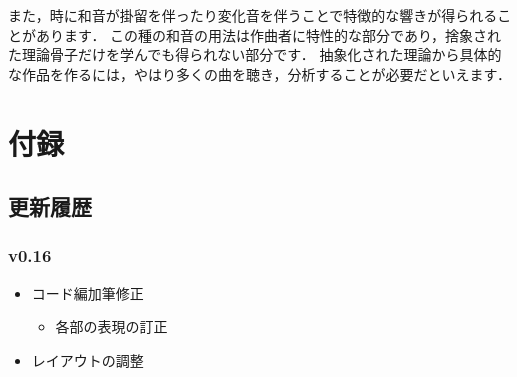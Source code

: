 \documentclass[dvipdfmx,uplatex,b5paper,openany,jbase=12Q,nomag*,textwidth-limit=44%
               ]{gachimuchi}[2020/05/05]
\begin{document}
また，時に和音が掛留を伴ったり変化音を伴うことで特徴的な響きが得られることがあります．
この種の和音の用法は作曲者に特性的な部分であり，捨象された理論骨子だけを学んでも得られない部分です．
抽象化された理論から具体的な作品を作るには，やはり多くの曲を聴き，分析することが必要だといえます．

\begin{comment}
\appendix
\chapter{コード進行について}
コード進行を作る場合には，おおよそ次の要素を考える必要があるでしょう．
\begin{itemize}
  \item メロディとコードの整合性
  \item 前後のコード同士の整合性
  \item 楽曲とコードの複雑さの整合性
\end{itemize}
この内，1つ目については\chapref{harmonize}で，2つ目については\sectref{Chordconection}や\chapref{schluss}で述べています．
また3つ目についても，複雑なコードというのは\chapref{NonDiatonic}や\chapref{tension}などで述べています．
整合性というのは結局，複雑なコードを使うべき曲で複雑なコードを使うということと言えます．

\section{コード進行を}

\end{comment}

\clearpage%
\twocolumn
{}%
\backmatter
\chapter{付録}
\section{更新履歴}
\subsection{v0.16}
\begin{itemize}
  \item コード編加筆修正
  \begin{itemize}
    \item 各部の表現の訂正
  \end{itemize}
  \item レイアウトの調整
\end{itemize}
\end{document}
